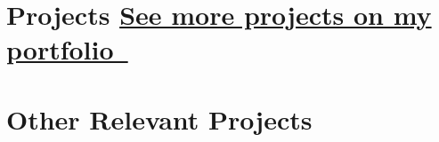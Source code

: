 \section*{Projects \hfill \href{https://harshanalf.netlify.app/projects}{See more projects on my portfolio~}}

\ProjectNumberingtrue
\setcounter{projectCount}{0}




\section*{Other Relevant Projects}




\BigDivider
